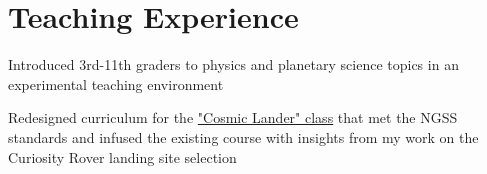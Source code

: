 \documentclass[letterpaper]{deedy-resume} %
\begin{document}
\begin{minipage}[t]{0.66\textwidth}
%
%
%
%
%
%
%
%
%


\section{Teaching Experience}


\vspace{\topsep} %
\begin{tightitemize}
\item Introduced 3rd-11th graders to physics and planetary science topics in an experimental teaching environment
\item Redesigned curriculum for the {\href{https://www.youtube.com/watch?v=t-3CwCxPF3I}{"Cosmic Lander" class}} that met the NGSS standards and infused the existing course with insights from my work on the Curiosity Rover landing site selection
\end{tightitemize}


\end{minipage}
\end{document}
